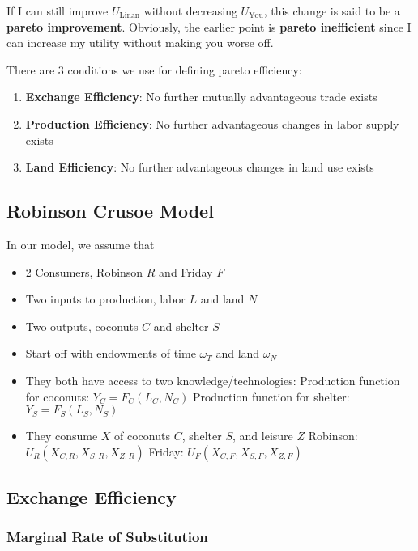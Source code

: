 \documentclass[11pt]{scrartcl}
\begin{document}
If I can still improve $U_{\mathrm{Linan}}$ without decreasing $U_{\mathrm{You}}$, this change is said to be a \textbf{pareto improvement}. Obviously, the earlier point is \textbf{pareto inefficient} since I can increase my utility without making you worse off.

There are 3 conditions we use for defining pareto efficiency:

\begin{enumerate}
\item \textbf{Exchange Efficiency}: No further mutually advantageous trade exists
\item \textbf{Production Efficiency}: No further advantageous changes in labor supply exists
\item \textbf{Land Efficiency}: No further advantageous changes in land use exists
\end{enumerate}

\subsection{Robinson Crusoe Model}

In our model, we assume that

\begin{itemize}
\item 2 Consumers, Robinson $R$ and Friday $F$
\item Two inputs to production, labor $L$ and land $N$
\item Two outputs, coconuts $C$ and shelter $S$
\item Start off with endowments of time $\omega_T$ and land $\omega_N$
\item They both have access to two knowledge/technologies:
	\subitem Production function for coconuts: $Y_C = F_C(L_C, N_C)$
	\subitem Production function for shelter: $Y_S = F_S(L_S, N_S)$
\item They consume $X$ of coconuts $C$, shelter $S$, and leisure $Z$
	\subitem Robinson: $U_R(X_{C,R}, X_{S,R}, X_{Z,R})$
	\subitem Friday: $U_F(X_{C,F}, X_{S,F}, X_{Z,F})$
\end{itemize}

\subsection{Exchange Efficiency}

\subsubsection{Marginal Rate of Substitution}
\end{document}
